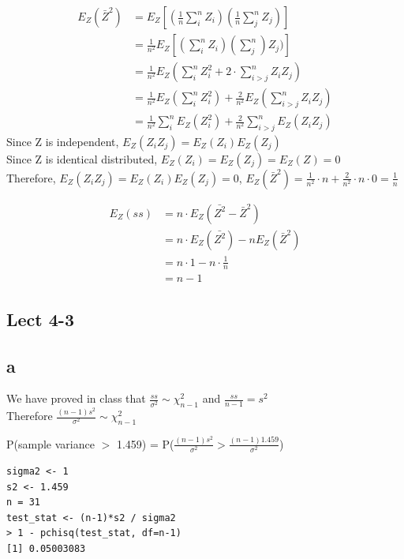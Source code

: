 \documentclass[11pt,letterpaper]{article}
\begin{document}
\begin{align*}
E_Z(\bar{Z}^2) &= E_Z[ (\frac{1}{n} \sum_i^n Z_i) ( \frac{1}{n} \sum_j^n Z_j ) ] \\
&= \frac{1}{n^2} E_Z[(\sum_i^n Z_i)(\sum_j^n) Z_j)] \\
&= \frac{1}{n^2} E_Z( \sum_i^n Z_i^2 + 2 \cdot \sum_{i > j}^n Z_i Z_j) \\
&= \frac{1}{n^2} E_Z( \sum_i^n Z_i^2  ) + \frac{2}{n^2} E_Z(\sum_{i>j}^n Z_i Z_j) \\
&= \frac{1}{n^2}  \sum_i^nE_Z( Z_i^2  ) + \frac{2}{n^2}\sum_{i>j}^n E_Z( Z_i Z_j) 
\end{align*}
Since Z is independent, $ E_Z(Z_iZ_j) = E_Z(Z_i) E_Z(Z_j) $ \\

\noindent Since Z is identical distributed, $E_Z(Z_i) = E_Z(Z_j) = E_Z(Z) = 0$ \\

\noindent Therefore, $E_Z(Z_iZ_j) =  E_Z(Z_i) E_Z(Z_j) =0$, $E_Z(\bar{Z}^2) = \frac{1}{n^2} \cdot n + \frac{2}{n^2} \cdot n \cdot 0 = \frac{1}{n}$

\begin{align*}
E_Z(ss) &= n\cdot E_Z(\bar{Z^2} - \bar{Z}^2) \\
&= n\cdot E_Z(\bar{Z^2}) - nE_Z(\bar{Z}^2) \\
&= n \cdot 1 - n \cdot \frac{1}{n} \\
&= n - 1
\end{align*}

\subsection*{Lect 4-3}
\subsection*{a}
We have proved in class that $\frac{ss}{\sigma^2} \sim \chi^2_{n-1}$ and $\frac{ss}{n-1} = s^2$ \\

\noindent Therefore $\frac{(n - 1)s^2}{\sigma^2} \sim \chi^2_{n-1}$

\noindent P(sample variance $>$ 1.459) = P($\frac{(n-1)s^2}{\sigma^2} > \frac{(n-1) 1.459}{\sigma^2}$)

\begin{verbatim}
sigma2 <- 1
s2 <- 1.459
n = 31
test_stat <- (n-1)*s2 / sigma2
> 1 - pchisq(test_stat, df=n-1)
[1] 0.05003083
\end{verbatim}
\end{document}
